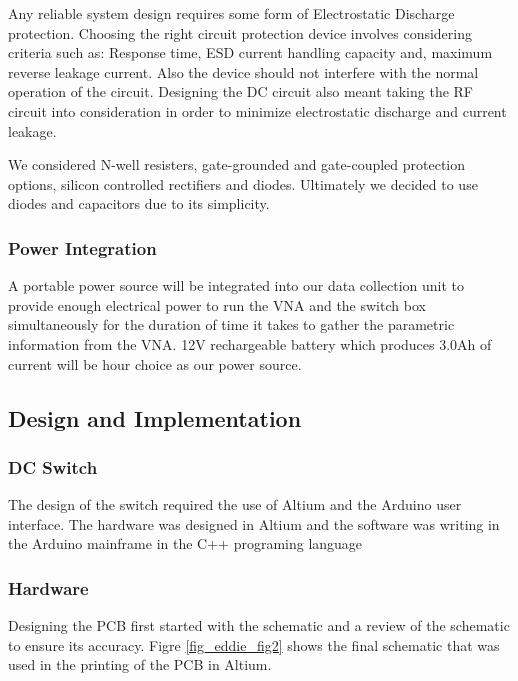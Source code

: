 Any reliable system design requires some form of Electrostatic Discharge protection. Choosing the right circuit protection device involves considering criteria such as: Response time, ESD current handling capacity and, maximum reverse leakage current. Also the device should not interfere with the normal operation of the circuit. Designing the DC circuit also meant taking the RF circuit into consideration in order to minimize electrostatic discharge and current leakage. 

We considered N-well resisters, gate-grounded and gate-coupled protection options, silicon controlled rectifiers and diodes. Ultimately we decided to use diodes and capacitors due to its simplicity.

\subsubsection{Power Integration}

A portable power source will be integrated into our data collection unit to provide enough electrical power to run the VNA and the switch box simultaneously for the duration of time it takes to gather the parametric information from the VNA. 12V rechargeable battery which produces 3.0Ah of current will be hour choice as our power source.

\subsection{Design and Implementation}

\subsubsection{DC Switch}

The design of the switch required the use of Altium and the Arduino user interface. The hardware was designed in Altium and the software was writing in the Arduino mainframe in the C++ programing language 

\subsubsection{Hardware}

Designing the PCB first started with the schematic and a review of the schematic to ensure its accuracy. Figre \ref{fig_eddie_fig2} shows the final schematic that was used in the printing of the PCB in Altium.

